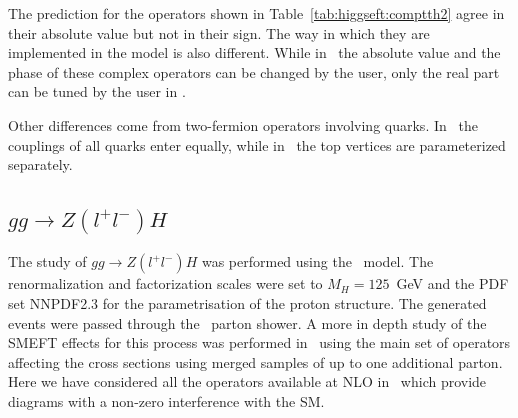 \begin{center}
  \begin{table}[h]
    \caption{ Comparison of the SM and interference predicitions for the ttH process between the \SMEFTsim\ and \SMEFTatNLO\ for \ctB\ (\cuBAbs) and \ctW\ (\cuWAbs). The operator definition are given in the way they are implemented in \SMEFTatNLO\ .}
    \label{tab:higgseft:comptth2}
\end{table}
\end{center}

The prediction for the operators shown in Table~\ref{tab:higgseft:comptth2} agree in their absolute value but not in their sign. The way in which they are implemented in the model is also different. While in \SMEFTsim\ the absolute value and the phase of these complex operators can be changed by the user, only the real part can be tuned by the user in \SMEFTatNLO.

Other differences come from two-fermion operators involving quarks. In \SMEFTsim\ the couplings of all quarks enter equally, while in \SMEFTatNLO\ the top vertices are parameterized separately. 


\subsection{$gg\to Z(l^{+}l^{-})H$}
\label{sec:higgseft:ggzh}
The study of  $gg\to Z(l^{+}l^{-})H$ was performed using the \SMEFTatNLO\ model. The renormalization and factorization scales were set to $M_H=125$~GeV and the PDF set NNPDF2.3 for the parametrisation of the proton structure. The generated events were passed through the \Pythia\ parton shower. A more in depth study of the SMEFT effects for this process was performed in~\cite{Bylund:2016phk} using the main set of operators affecting the cross sections using merged samples of up to one additional parton. Here we have considered all the operators available at NLO in \SMEFTatNLO\ which provide diagrams with a non-zero interference with the SM.

